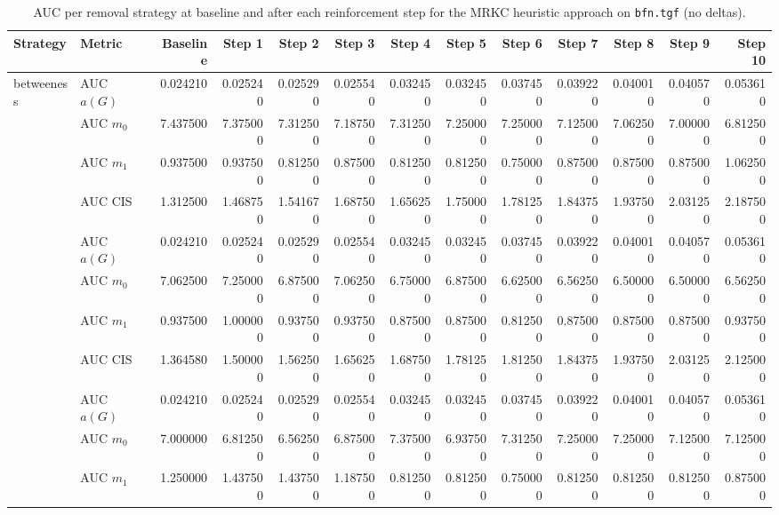 \begin{table}[htbp]
  \centering
  \caption{AUC per removal strategy at baseline and after each reinforcement step for the MRKC heuristic approach on \texttt{bfn.tgf} (no deltas).}
  \label{tab:bfn-mrkc_heuristic-auc}
\setlength{\tabcolsep}{2.5pt}
  \begin{tabular}{llrrrrrrrrrrr}
    \toprule
    \textbf{Strategy} & \textbf{Metric} & \textbf{Baseline} & \textbf{Step 1} & \textbf{Step 2} & \textbf{Step 3} & \textbf{Step 4} & \textbf{Step 5} & \textbf{Step 6} & \textbf{Step 7} & \textbf{Step 8} & \textbf{Step 9} & \textbf{Step 10} \\
    \midrule
    \multirow{4}{*}{betweeness} & AUC $a(G)$ & 0.024210 & 0.025240 & 0.025290 & 0.025540 & 0.032450 & 0.032450 & 0.037450 & 0.039220 & 0.040010 & 0.040570 & 0.053610 \\
    & AUC $m_0$ & 7.437500 & 7.375000 & 7.312500 & 7.187500 & 7.312500 & 7.250000 & 7.250000 & 7.125000 & 7.062500 & 7.000000 & 6.812500 \\
    & AUC $m_1$ & 0.937500 & 0.937500 & 0.812500 & 0.875000 & 0.812500 & 0.812500 & 0.750000 & 0.875000 & 0.875000 & 0.875000 & 1.062500 \\
    & AUC CIS & 1.312500 & 1.468750 & 1.541670 & 1.687500 & 1.656250 & 1.750000 & 1.781250 & 1.843750 & 1.937500 & 2.031250 & 2.187500 \\
    \addlinespace
    \multirow{4}{*}{closeness} & AUC $a(G)$ & 0.024210 & 0.025240 & 0.025290 & 0.025540 & 0.032450 & 0.032450 & 0.037450 & 0.039220 & 0.040010 & 0.040570 & 0.053610 \\
    & AUC $m_0$ & 7.062500 & 7.250000 & 6.875000 & 7.062500 & 6.750000 & 6.875000 & 6.625000 & 6.562500 & 6.500000 & 6.500000 & 6.562500 \\
    & AUC $m_1$ & 0.937500 & 1.000000 & 0.937500 & 0.937500 & 0.875000 & 0.875000 & 0.812500 & 0.875000 & 0.875000 & 0.875000 & 0.937500 \\
    & AUC CIS & 1.364580 & 1.500000 & 1.562500 & 1.656250 & 1.687500 & 1.781250 & 1.812500 & 1.843750 & 1.937500 & 2.031250 & 2.125000 \\
    \addlinespace
    \multirow{4}{*}{core influence} & AUC $a(G)$ & 0.024210 & 0.025240 & 0.025290 & 0.025540 & 0.032450 & 0.032450 & 0.037450 & 0.039220 & 0.040010 & 0.040570 & 0.053610 \\
    & AUC $m_0$ & 7.000000 & 6.812500 & 6.562500 & 6.875000 & 7.375000 & 6.937500 & 7.312500 & 7.250000 & 7.250000 & 7.125000 & 7.125000 \\
    & AUC $m_1$ & 1.250000 & 1.437500 & 1.437500 & 1.187500 & 0.812500 & 0.812500 & 0.750000 & 0.812500 & 0.812500 & 0.812500 & 0.875000 \\

\end{tabular}
\end{table}
